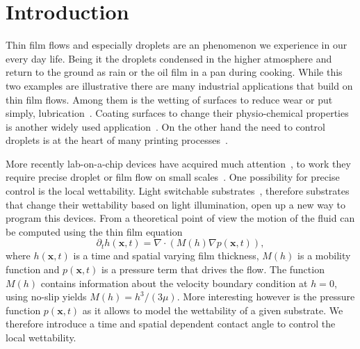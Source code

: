 \documentclass[twocolumn,amsmath,amssymb,showpacs,pre,nofootinbib,superscriptaddress]{revtex4-1} %
\begin{document}
\maketitle

\newcommand{\ts}{\textsuperscript}

\section{Introduction}\label{sec:intro}
Thin film flows and especially droplets are an phenomenon we experience in our every day life.
Being it the droplets condensed in the higher atmosphere and return to the ground as rain or the oil film in a pan during cooking. 
While this two examples are illustrative there are many industrial applications that build on thin film flows. 
Among them is the wetting of surfaces to reduce wear or put simply, lubrication~\cite{ReynoldsLubr, gross1980fluid, szeri2010fluid}. 
Coating surfaces to change their physio-chemical properties is another widely used application~\cite{DERYCK1998278, doi:10.1146/annurev.fluid.31.1.347, DASILVASOBRINHO19991204}.
On the other hand the need to control droplets is at the heart of many printing processes~\cite{singh2010inkjet, jo2009evaluation}.

More recently lab-on-a-chip devices have acquired much attention~\cite{C6LC00387G,Focke}, to work they require precise droplet or film flow on small scales~\cite{stone2004engineering, darhuber2010planar}.
One possibility for precise control is the local wettability.
Light switchable substrates~\cite{WANG200718}, therefore substrates that change their wettability based on light illumination, open up a new way to program this devices. 
From a theoretical point of view the motion of the fluid can be computed using the thin film equation~\cite{RevModPhys.69.931, RevModPhys.81.1131, RevModPhys.81.739, ReynoldsLubr}
\begin{equation}\label{eq:thin_film}
    \partial_t h(\mathbf{x},t) = \nabla\cdot\left(M(h)\nabla p(\mathbf{x},t)\right),
\end{equation}
where $h(\mathbf{x},t)$ is a time and spatial varying film thickness, $M(h)$ is a mobility function and $p(\mathbf{x},t)$ is a pressure term that drives the flow. 
The function $M(h)$ contains information about the velocity boundary condition at $h=0$, using no-slip yields $M(h) = h^3/(3\mu)$.
More interesting however is the pressure function $p(\mathbf{x},t)$ as it allows to model the wettability of a given substrate.
We therefore introduce a time and spatial dependent contact angle to control the local wettability.
\end{document}
